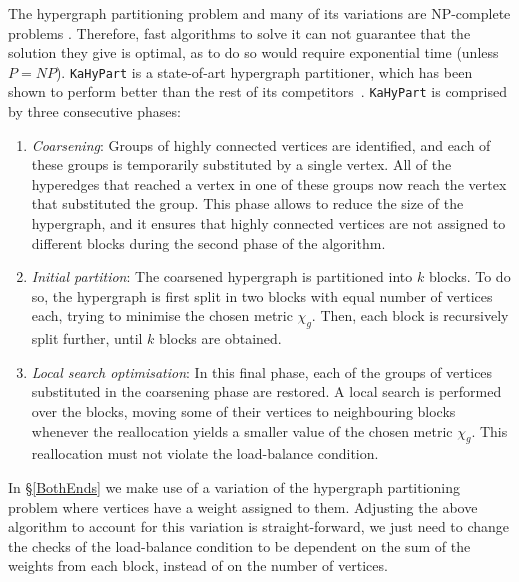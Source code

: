 The hypergraph partitioning problem and many of its variations are NP-complete problems \citep{NP-complete}. Therefore, fast algorithms to solve it can not guarantee that the solution they give is optimal, as to do so would require exponential time (unless \(P = NP\)). \texttt{KaHyPart} is a state-of-art hypergraph partitioner, which has been shown to perform better than the rest of its competitors~\citep{KaHyPart}. \texttt{KaHyPart} is comprised by three consecutive phases:

\begin{enumerate}
  \item \textit{Coarsening}: Groups of highly connected vertices are identified, and each of these groups is temporarily substituted by a single vertex. All of the hyperedges that reached a vertex in one of these groups now reach the vertex that substituted the group. This phase allows to reduce the size of the hypergraph, and it ensures that highly connected vertices are not assigned to different blocks during the second phase of the algorithm.
  \item \textit{Initial partition}: The coarsened hypergraph is partitioned into \(k\) blocks. To do so, the hypergraph is first split in two blocks with equal number of vertices each, trying to minimise the chosen metric \(\chi_g\). Then, each block is recursively split further, until \(k\) blocks are obtained.
  \item \textit{Local search optimisation}: In this final phase, each of the groups of vertices substituted in the coarsening phase are restored. A local search is performed over the blocks, moving some of their vertices to neighbouring blocks whenever the reallocation yields a smaller value of the chosen metric \(\chi_g\). This reallocation must not violate the load-balance condition.
\end{enumerate}

In \S\ref{BothEnds} we make use of a variation of the hypergraph partitioning problem where vertices have a weight assigned to them. Adjusting the above algorithm to account for this variation is straight-forward, we just need to change the checks of the load-balance condition to be dependent on the sum of the weights from each block, instead of on the number of vertices.
